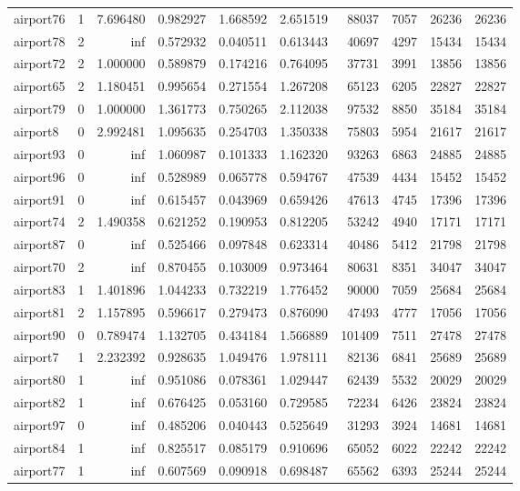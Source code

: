 \begin{longtable}{|l|r|r|r|r|r|r|r|r|r|}
airport76 & 1 & 7.696480 & 0.982927 & 1.668592 & 2.651519 & 88037 & 7057 & 26236 & 26236 \\
airport78 & 2 & inf & 0.572932 & 0.040511 & 0.613443 & 40697 & 4297 & 15434 & 15434 \\
airport72 & 2 & 1.000000 & 0.589879 & 0.174216 & 0.764095 & 37731 & 3991 & 13856 & 13856 \\
airport65 & 2 & 1.180451 & 0.995654 & 0.271554 & 1.267208 & 65123 & 6205 & 22827 & 22827 \\
airport79 & 0 & 1.000000 & 1.361773 & 0.750265 & 2.112038 & 97532 & 8850 & 35184 & 35184 \\
airport8 & 0 & 2.992481 & 1.095635 & 0.254703 & 1.350338 & 75803 & 5954 & 21617 & 21617 \\
airport93 & 0 & inf & 1.060987 & 0.101333 & 1.162320 & 93263 & 6863 & 24885 & 24885 \\
airport96 & 0 & inf & 0.528989 & 0.065778 & 0.594767 & 47539 & 4434 & 15452 & 15452 \\
airport91 & 0 & inf & 0.615457 & 0.043969 & 0.659426 & 47613 & 4745 & 17396 & 17396 \\
airport74 & 2 & 1.490358 & 0.621252 & 0.190953 & 0.812205 & 53242 & 4940 & 17171 & 17171 \\
airport87 & 0 & inf & 0.525466 & 0.097848 & 0.623314 & 40486 & 5412 & 21798 & 21798 \\
airport70 & 2 & inf & 0.870455 & 0.103009 & 0.973464 & 80631 & 8351 & 34047 & 34047 \\
airport83 & 1 & 1.401896 & 1.044233 & 0.732219 & 1.776452 & 90000 & 7059 & 25684 & 25684 \\
airport81 & 2 & 1.157895 & 0.596617 & 0.279473 & 0.876090 & 47493 & 4777 & 17056 & 17056 \\
airport90 & 0 & 0.789474 & 1.132705 & 0.434184 & 1.566889 & 101409 & 7511 & 27478 & 27478 \\
airport7 & 1 & 2.232392 & 0.928635 & 1.049476 & 1.978111 & 82136 & 6841 & 25689 & 25689 \\
airport80 & 1 & inf & 0.951086 & 0.078361 & 1.029447 & 62439 & 5532 & 20029 & 20029 \\
airport82 & 1 & inf & 0.676425 & 0.053160 & 0.729585 & 72234 & 6426 & 23824 & 23824 \\
airport97 & 0 & inf & 0.485206 & 0.040443 & 0.525649 & 31293 & 3924 & 14681 & 14681 \\
airport84 & 1 & inf & 0.825517 & 0.085179 & 0.910696 & 65052 & 6022 & 22242 & 22242 \\
airport77 & 1 & inf & 0.607569 & 0.090918 & 0.698487 & 65562 & 6393 & 25244 & 25244 \\

\end{longtable}
